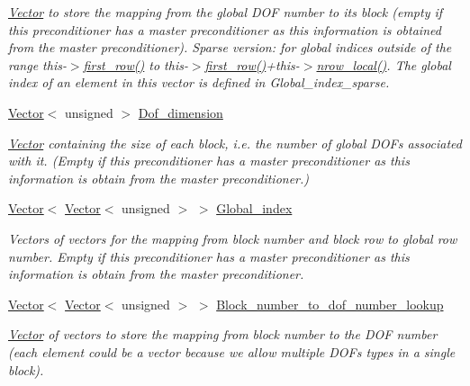\begin{DoxyCompactItemize}
\begin{DoxyCompactList}\small\item\em \hyperlink{classoomph_1_1Vector}{Vector} to store the mapping from the global D\+OF number to its block (empty if this preconditioner has a master preconditioner as this information is obtained from the master preconditioner). Sparse version\+: for global indices outside of the range this-\/$>$\hyperlink{classoomph_1_1DistributableLinearAlgebraObject_ab00a3919b8634c698749f14a4d92947d}{first\+\_\+row()} to this-\/$>$\hyperlink{classoomph_1_1DistributableLinearAlgebraObject_ab00a3919b8634c698749f14a4d92947d}{first\+\_\+row()}+this-\/$>$\hyperlink{classoomph_1_1DistributableLinearAlgebraObject_a9bd7e1d242c69a28da85a804a7717fce}{nrow\+\_\+local()}. The global index of an element in this vector is defined in Global\+\_\+index\+\_\+sparse. \end{DoxyCompactList}\item 
\hyperlink{classoomph_1_1Vector}{Vector}$<$ unsigned $>$ \hyperlink{classoomph_1_1BlockPreconditioner_a55900a517c9e354b9fc49624483b7273}{Dof\+\_\+dimension}
\begin{DoxyCompactList}\small\item\em \hyperlink{classoomph_1_1Vector}{Vector} containing the size of each block, i.\+e. the number of global D\+O\+Fs associated with it. (Empty if this preconditioner has a master preconditioner as this information is obtain from the master preconditioner.) \end{DoxyCompactList}\item 
\hyperlink{classoomph_1_1Vector}{Vector}$<$ \hyperlink{classoomph_1_1Vector}{Vector}$<$ unsigned $>$ $>$ \hyperlink{classoomph_1_1BlockPreconditioner_a79ea9c428aa8533c371ef3f0048a3a92}{Global\+\_\+index}
\begin{DoxyCompactList}\small\item\em Vectors of vectors for the mapping from block number and block row to global row number. Empty if this preconditioner has a master preconditioner as this information is obtain from the master preconditioner. \end{DoxyCompactList}\item 
\hyperlink{classoomph_1_1Vector}{Vector}$<$ \hyperlink{classoomph_1_1Vector}{Vector}$<$ unsigned $>$ $>$ \hyperlink{classoomph_1_1BlockPreconditioner_a61561c20a262195f1bdacda515a2394b}{Block\+\_\+number\+\_\+to\+\_\+dof\+\_\+number\+\_\+lookup}
\begin{DoxyCompactList}\small\item\em \hyperlink{classoomph_1_1Vector}{Vector} of vectors to store the mapping from block number to the D\+OF number (each element could be a vector because we allow multiple D\+O\+Fs types in a single block). \end{DoxyCompactList}\item 

\end{DoxyCompactItemize}
